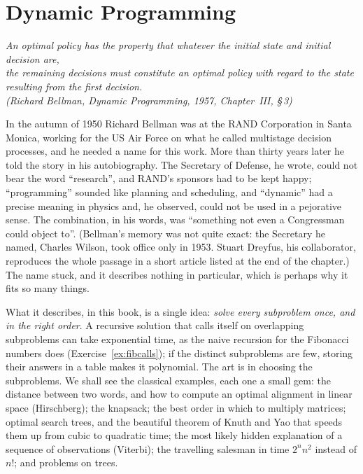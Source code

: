 \chapter{Dynamic Programming}\label{ch:dynamic}

\begin{center}\itshape
An optimal policy has the property that whatever the initial state and initial decision are,\\
the remaining decisions must constitute an optimal policy with regard to the state\\
resulting from the first decision.\\
\upshape(Richard Bellman, \emph{Dynamic Programming}, 1957, Chapter~III, \S\,3)
\end{center}

In the autumn of 1950 Richard Bellman was at the RAND Corporation in Santa Monica, working for the US Air Force on what he called multistage decision
processes, and he needed a name for this work. More than thirty years later he told the story in his autobiography. The Secretary of Defense, he wrote,
could not bear the word ``research'', and RAND's sponsors had to be kept happy; ``programming'' sounded like planning and scheduling, and
``dynamic'' had a precise meaning in physics and, he observed, could not be used in a pejorative sense. The combination, in his words, was
``something not even a Congressman could object to''. (Bellman's memory was not quite exact: the Secretary he named, Charles Wilson, took office only in 1953. Stuart Dreyfus, his collaborator,
reproduces the whole passage in a short article listed at the end of the chapter.) The name stuck, and it describes nothing in particular, which is perhaps why it
fits so many things.

What it describes, in this book, is a single idea: \emph{solve every subproblem once, and in the right order}. A recursive solution that calls itself on
overlapping subproblems can take exponential time, as the naive recursion for the Fibonacci numbers does (Exercise~\ref{ex:fibcalls}); if the distinct subproblems
are few, storing their answers in a table makes it polynomial. The art is in choosing the subproblems. We shall see the classical examples, each one a small gem:
the distance between two words, and how to compute an optimal alignment in linear space (Hirschberg); the knapsack; the best order in which to multiply matrices;
optimal search trees, and the beautiful theorem of Knuth and Yao that speeds them up from cubic to quadratic time; the most likely hidden explanation of a sequence of
observations (Viterbi); the travelling salesman in time $2^nn^2$ instead of $n!$; and problems on trees.


